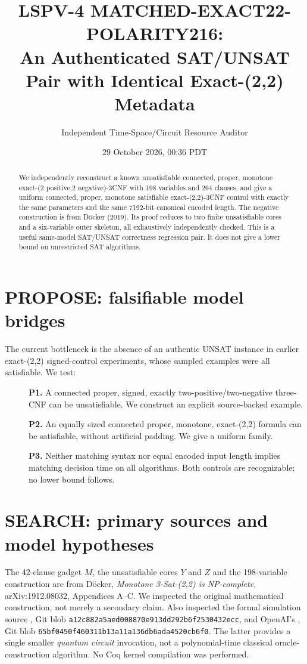 \documentclass[11pt]{article}
\title{LSPV-4 MATCHED-EXACT22-POLARITY216:\\
An Authenticated SAT/UNSAT Pair with Identical Exact-(2,2) Metadata}
\author{Independent Time-Space/Circuit Resource Auditor}
\date{29 October 2026, 00:36 PDT}
\begin{document}
\maketitle
\begin{abstract}
We independently reconstruct a known unsatisfiable connected, proper,
monotone exact-(2 positive,2 negative)-3CNF with 198 variables and 264
clauses, and give a uniform connected, proper, monotone satisfiable
exact-(2,2)-3CNF control with exactly the same parameters and the same
7192-bit canonical encoded length. The negative construction is from
D\"ocker (2019). Its proof reduces to two finite unsatisfiable cores and
a six-variable outer skeleton, all exhaustively independently checked.
This is a useful same-model SAT/UNSAT correctness regression pair.
It does not give a lower bound on unrestricted SAT algorithms.
\end{abstract}

\section{PROPOSE: falsifiable model bridges}
The current bottleneck is the absence of an authentic UNSAT instance in
earlier exact-(2,2) signed-control experiments, whose sampled examples
were all satisfiable. We test:
\begin{description}
\item[] \textbf{P1.} A connected proper, signed, exactly two-positive/two-negative
three-CNF can be unsatisfiable. We construct an explicit source-backed example.
\item[] \textbf{P2.} An equally sized connected proper, monotone, exact-(2,2)
formula can be satisfiable, without artificial padding. We give a uniform family.
\item[] \textbf{P3.} Neither matching syntax nor equal encoded input length
implies matching decision time on all algorithms. Both controls are
recognizable; no lower bound follows.
\end{description}

\section{SEARCH: primary sources and model hypotheses}
The 42-clause gadget $M$, the unsatisfiable cores $Y$ and $Z$ and the
198-variable construction are from D\"ocker, \emph{Monotone 3-Sat-(2,2)
is NP-complete}, arXiv:1912.08032, Appendices A--C.
We inspected the original mathematical construction, not merely a secondary
claim. Also inspected the formal simulation source
,
Git blob \texttt{a12c882a5aed008870e913dd292b6f2530432ecc},
and OpenAI's ,
Git blob \texttt{65bf0450f460311b13a11a136db6ada4520cb6f0}.
The latter provides a single smaller \emph{quantum circuit} invocation,
not a polynomial-time classical oracle-construction algorithm.
No Coq kernel compilation was performed.
\end{document}
